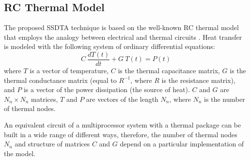 \subsection{RC Thermal Model}
The proposed SSDTA technique is based on the well-known RC thermal model that employs the analogy between electrical and thermal circuits \cite{kreith2000}. Heat transfer is modeled with the following system of ordinary differential equations:
\begin{equation} \label{eq:thermal-ode}
  C \: \frac{dT(t)}{dt} + G \: T(t) = P(t)
\end{equation}
where $T$ is a vector of temperature, $C$ is the thermal capacitance matrix, $G$ is the thermal conductance matrix (equal to $R^{-1}$, where $R$ is the resistance matrix), and $P$ is a vector of the power dissipation (the source of heat). $C$ and $G$ are $N_n \times N_n$ matrices, $T$ and $P$ are vectors of the length $N_n$, where $N_n$ is the number of thermal nodes.

An equivalent circuit of a multiprocessor system with a thermal package can be built in a wide range of different ways, therefore, the number of thermal nodes $N_n$ and structure of matrices $C$ and $G$ depend on a particular implementation of the model.
